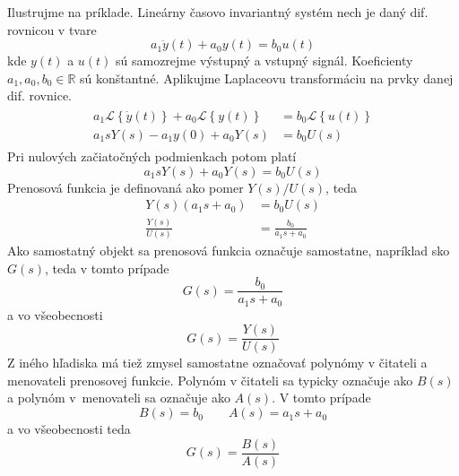\documentclass[a4paper, 10pt, ]{article}
\begin{document}
Ilustrujme na príklade. Lineárny časovo invariantný systém nech je daný dif. rovnicou v tvare
\begin{equation}
    a_1 \dot y(t) + a_0 y(t) = b_0 u(t)
\end{equation}
kde $y(t)$ a $u(t)$ sú samozrejme výstupný a vstupný signál. Koeficienty $a_1, a_0, b_0 \in \mathbb R$ sú konštantné. Aplikujme Laplaceovu transformáciu na prvky danej dif. rovnice.
\begin{align}
    \begin{aligned}
        a_1 \mathcal{L} \left\{ \dot y(t) \right\} + a_0 \mathcal{L} \left\{ y(t) \right\} &= b_0 \mathcal{L} \left\{ u(t) \right\} \\
        a_1 s Y(s) - a_1 y(0) + a_0 Y(s) &= b_0 U(s)
    \end{aligned}
\end{align}
Pri nulových začiatočných podmienkach potom platí
\begin{equation}
    a_1 s Y(s) + a_0 Y(s) = b_0 U(s)
\end{equation}
Prenosová funkcia je definovaná ako pomer $Y(s)/U(s)$, teda
\begin{subequations}
    \begin{align}
        Y(s) \left( a_1 s + a_0 \right) &= b_0 U(s) \\
        \frac{Y(s)}{U(s)} &= \frac{b_0}{a_1 s + a_0}
    \end{align}
\end{subequations}
Ako samostatný objekt sa prenosová funkcia označuje samostatne, napríklad sko $G(s)$, teda v tomto prípade
\begin{equation} \label{prenosfunkciapriklad}
    G(s) = \frac{b_0}{a_1 s + a_0}  
\end{equation}
a vo všeobecnosti
\begin{equation}
    G(s) = \frac{Y(s)}{U(s)}
\end{equation}
Z iného hľadiska má tiež zmysel samostatne označovať polynómy v čitateli a menovateli prenosovej funkcie. Polynóm v čitateli sa typicky označuje ako $B(s)$ a polynóm v~menovateli sa označuje ako $A(s)$. V tomto prípade 
\begin{equation}
    B(s) = b_0 \qquad A(s) = a_1 s + a_0
\end{equation}
a vo všeobecnosti teda
\begin{equation}
    G(s) = \frac{B(s)}{A(s)}
\end{equation}

    
\end{document}
